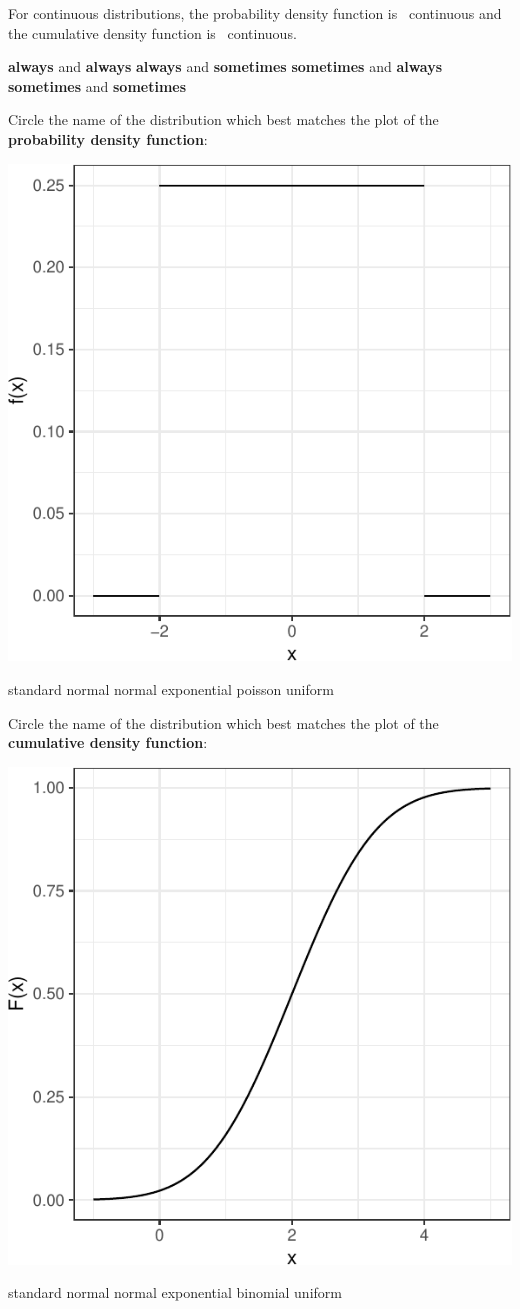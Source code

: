 \documentclass[fleqn,answers,addpoints]{exam}
\begin{document}
\begin{questions}

\question[2] For continuous distributions, the probability density
function is \fillin~continuous and the cumulative density function is
\fillin~continuous.

\begin{oneparchoices}
\choice \textbf{always} and \textbf{always}
\choice \textbf{always} and \textbf{sometimes}
\choice \textbf{sometimes} and \textbf{always}
\choice \textbf{sometimes} and \textbf{sometimes}
\end{oneparchoices}
\vspace{1cm}

\question[3]Circle the name of the distribution which best matches the
plot of the \textbf{probability density function}:

\begin{center}\includegraphics[width=.4\linewidth,height=.4\linewidth]{stat305-exam2_files/figure-latex/unnamed-chunk-3-1} \end{center}
\begin{oneparchoices}
\choice standard normal
\choice normal 
\choice exponential 
\choice poisson
\choice uniform
\end{oneparchoices}

\question[3]Circle the name of the distribution which best matches the
plot of the \textbf{cumulative density function}:

\begin{center}\includegraphics[width=.4\linewidth,height=.4\linewidth]{stat305-exam2_files/figure-latex/unnamed-chunk-4-1} \end{center}
\begin{oneparchoices}
\choice standard normal
\choice normal 
\choice exponential 
\choice binomial
\choice uniform
\end{oneparchoices}
\vspace{1cm}


\end{questions}
\end{document}
